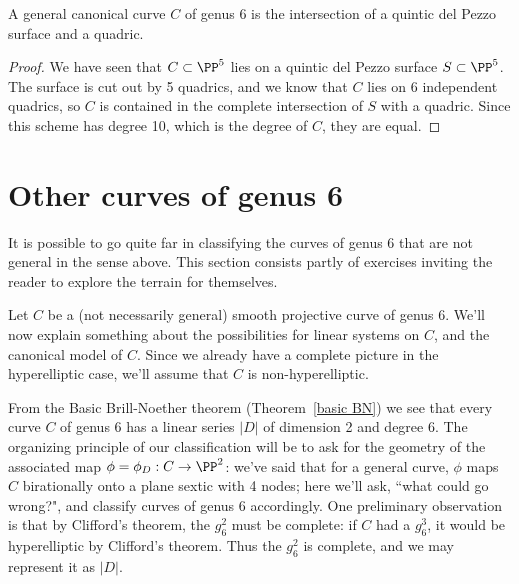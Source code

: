 \begin{theorem}
A general canonical curve $C$ of genus 6 is the intersection of a quintic del Pezzo surface and a quadric. 
\end{theorem}

\begin{proof}
We have seen that $C \subset \PP^5$ lies on a quintic del Pezzo surface $S \subset \PP^5$. The surface is cut out by 5 quadrics, and we know that $C$ lies on 6 independent quadrics,
so $C$ is contained in the complete intersection of $S$ with a quadric. Since this scheme has degree 10, which is the degree of $C$, they are equal.
\end{proof}


\section{Other curves of genus 6}

It is possible to go quite far in classifying the curves of genus 6 that are not general in the sense above. This section consists partly of exercises inviting the reader to explore the terrain for themselves.


Let $C$ be a (not necessarily general) smooth projective curve of genus 6. We'll now explain something about the possibilities for  linear systems on $C$, and the canonical model of $C$. Since we already have a complete picture in the hyperelliptic case, we'll assume that $C$ is non-hyperelliptic.

From the Basic Brill-Noether theorem (Theorem~\ref{basic BN}) we see that every curve $C$ of genus 6 has a linear series $|D|$ of dimension 2
and degree 6. The organizing principle of our classification will be to ask for the geometry of the associated map $\phi = \phi_D : C \to \PP^2$: we've said that for a general curve,  $\phi$ maps $C$ birationally onto a plane sextic with 4 nodes; here we'll ask, ``what could go wrong?", and classify curves of genus 6 accordingly. One preliminary observation is that by Clifford's theorem, the $g^2_6$ must be complete:  if $C$ had a $g^3_6$, it would be hyperelliptic by Clifford's theorem. Thus the $g^2_6$ is complete, and we may represent it as $|D|$.

